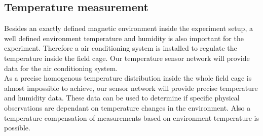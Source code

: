 \documentclass[a4paper]{scrreprt}
\begin{document}
\subsection{Temperature measurement}
Besides an exactly defined magnetic environment inside the experiment setup, a well defined
environment temperature and humidity is also important for the experiment. Therefore a
air conditioning system is installed to regulate the temperature inside the field cage.
Our temperature sensor network will provide data for the air conditioning system.\\
As a precise homogenous temperature distribution inside the whole field cage is
almost impossible to achieve, our sensor network will provide precise temperature and humidity data. These data can be used to determine if specific physical observations are dependant
on temperature changes in the environment. Also a temperature compensation of measurements
based on environment temperature is possible.
\end{document}
